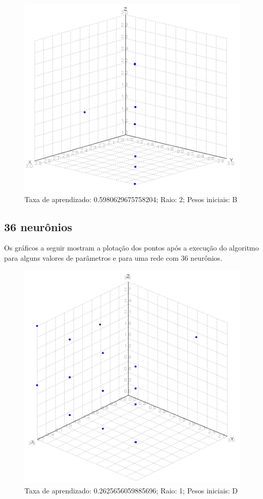 \begin{figure}[ht!]
	\centering
	\includegraphics[scale=0.4]{./imgs/2b2.png}
	\caption{Taxa de aprendizado: 0.5980629675758204; Raio: 2; Pesos iniciais: B}
\end{figure}

\subsection{36 neurônios}
Os gráficos a seguir mostram a plotação dos pontos após a execução do algoritmo para alguns valores de parâmetros e para
uma rede com 36 neurônios.

\begin{figure}[ht!]
	\centering
	\includegraphics[scale=0.4]{./imgs/2d1.png}
	\caption{Taxa de aprendizado: 0.2625656059885696; Raio: 1; Pesos iniciais: D}
\end{figure}

